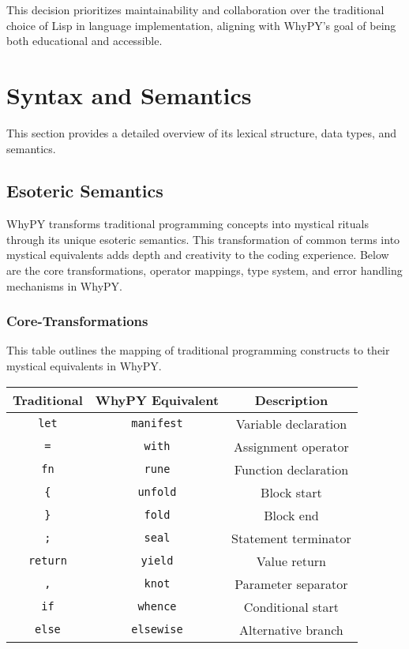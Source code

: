 \documentclass[conference]{IEEEtran}
\begin{document}
This decision prioritizes maintainability and collaboration over the traditional choice of Lisp in language implementation, aligning with WhyPY's goal of being both educational and accessible.


\section{Syntax and Semantics}
This section provides a detailed overview of its lexical structure, data types, and semantics.




\subsection{Esoteric Semantics}
WhyPY transforms traditional programming concepts into mystical rituals through its unique esoteric semantics. This transformation of common terms into mystical equivalents adds depth and creativity to the coding experience. Below are the core transformations, operator mappings, type system, and error handling mechanisms in WhyPY.

\subsubsection{Core-Transformations}
This table outlines the mapping of traditional programming constructs to their mystical equivalents in WhyPY. \\ 
\par \vspace{1mm} 
\begin{tabular}{|c|c|c|}
\hline
\textbf{Traditional} & \textbf{WhyPY Equivalent} & \textbf{Description} \\
\hline
\texttt{let} & \texttt{manifest} & Variable declaration \\
\texttt{=} & \texttt{with} & Assignment operator \\
\texttt{fn} & \texttt{rune} & Function declaration \\
\texttt{\{} & \texttt{unfold} & Block start \\
\texttt{\}} & \texttt{fold} & Block end \\
\texttt{;} & \texttt{seal} & Statement terminator \\
\texttt{return} & \texttt{yield} & Value return \\
\texttt{,} & \texttt{knot} & Parameter separator \\
\texttt{if} & \texttt{whence} & Conditional start \\
\texttt{else} & \texttt{elsewise} & Alternative branch \\
\hline
\end{tabular}
\\
\\
\end{document}
